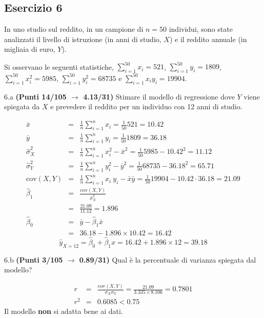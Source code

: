 \documentclass[
  11pt,
]{book}
\theoremstyle{mytheoremstyle}
\theoremstyle{mydefstyle}
\newenvironment{sol}
  {
  \begin{tcolorbox}[enhanced,breakable,arc=0.1mm,boxrule=1pt,colback=white,colframe=iblue,
  title=\bf \fontfamily{lmss}\selectfont \hspace{.5 cm} Soluzione,drop fuzzy shadow]

}{
\end{tcolorbox}
  }
\begin{document}
\subsection{Esercizio 6}\label{esercizio-6-28}

In uno studio sul reddito, in un campione di \(n=50\) individui, sono state analizzati il livello di istruzione (in anni di studio, \(X\)) e il reddito annuale (in migliaia di euro, \(Y\)).

Si osservano le seguenti statistiche, \(\sum_{i=1}^{50}x_i=521\), \(\sum_{i=1}^{50}y_i=1809\),
\(\sum_{i=1}^{50}x_i^2=5985\), \(\sum_{i=1}^{50}y_i^2=68735\) e \(\sum_{i=1}^{50}x_iy_i=19904\).

6.a \textbf{(Punti 14/105 \(\rightarrow\) 4.13/31)} Stimare il modello di regressione dove \(Y\) viene spiegata da \(X\) e prevedere il reddito per un individuo con 12 anni di studio.

\begin{sol}
\begin{eqnarray*}
           \bar x &=&\frac 1 n\sum_{i=1}^n x_i = \frac {1}{ 50 }  521 =  10.42 \\
           \bar y &=&\frac 1 n\sum_{i=1}^n y_i = \frac {1}{ 50 }  1809 =  36.18 \\
           \hat\sigma_X^2&=&\frac 1 n\sum_{i=1}^n x_i^2-\bar x^2=\frac {1}{ 50 }  5985  - 10.42 ^2= 11.12 \\
           \hat\sigma_Y^2&=&\frac 1 n\sum_{i=1}^n y_i^2-\bar y^2=\frac {1}{ 50 }  68735  - 36.18 ^2= 65.71 \\
           \text{cov}(X,Y)&=&\frac 1 n\sum_{i=1}^n x_i~y_i-\bar x\bar y=\frac {1}{ 50 }  19904 - 10.42 \cdot 36.18 = 21.09 \\
           \hat\beta_1 &=& \frac{\text{cov}(X,Y)}{\hat\sigma_X^2} \\
                    &=& \frac{ 21.09 }{ 11.12 }  =  1.896 \\
           \hat\beta_0 &=& \bar y - \hat\beta_1 \bar x\\
                    &=&  36.18 - 1.896 \times  10.42 = 16.42 
         \end{eqnarray*}\[\hat y_{X= 12 }=\hat\beta_0+\hat\beta_1 x= 16.42 + 1.896 \times 12 = 39.18 \]

\end{sol}

6.b \textbf{(Punti 3/105 \(\rightarrow\) 0.89/31)} Qual è la percentuale di varianza spiegata dal modello?

\begin{sol}
\begin{eqnarray*}
r&=&\frac{\text{cov}(X,Y)}{\sigma_X\sigma_Y}=\frac{ 21.09 }{ 3.335 \times 8.106 }= 0.7801 \\r^2&=& 0.6085 < 0.75
\end{eqnarray*}
Il modello \textbf{non} si adatta bene ai dati.

\end{sol}
\end{document}
